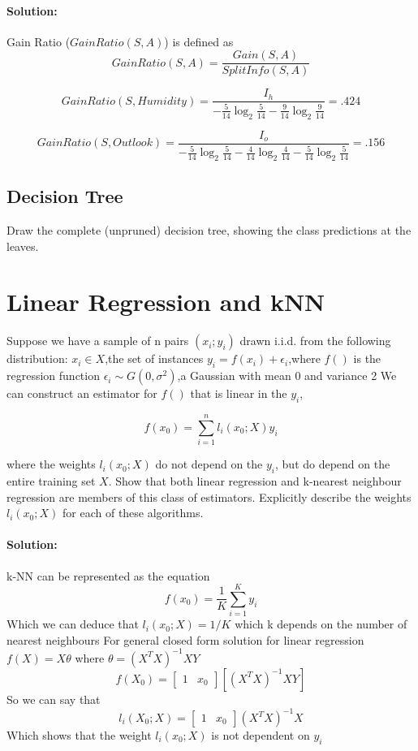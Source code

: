 \documentclass{article}
\begin{document}
\paragraph{Solution:}
Gain Ratio ($GainRatio(S,A)$) is defined as
$$ GainRatio(S,A) = \frac{Gain(S,A)}{SplitInfo(S,A)}
$$ 

$$ GainRatio(S,Humidity) = \frac{I_h}{-\frac{5}{14}\log_2\frac{5}{14} - \frac{9}{14}\log_2\frac{9}{14}} = .424
$$

$$ GainRatio(S,Outlook) = \frac{I_o}{-\frac{5}{14}\log_2\frac{5}{14} - \frac{4}{14}\log_2\frac{4}{14} - \frac{5}{14}\log_2\frac{5}{14}} = .156
$$

\subsection {Decision Tree} 
Draw the complete (unpruned) decision tree, showing the class predictions at the leaves. 


\section{Linear Regression and kNN}

Suppose we have a sample of n pairs $(x_i; y_i)$ drawn i.i.d. from the following
distribution:
\newline
$x_i\in X$,the set of instances
\newline 
$y_i = f(x_i) + \epsilon_i$,where $f()$ is the regression function
\newline 
$\epsilon_i \sim G(0,\sigma^2)$,a Gaussian with mean 0 and variance 2
\newline 
We can construct an estimator for $f()$ that is linear in the $y_i$,

$$f(x_0) =\displaystyle\sum\limits_{i=1}^n l_i(x_0; X)y_i
$$

where the weights $l_i(x_0;X)$ do not depend on the $y_i$, but do depend on the entire training set $X$. Show that
both linear regression and k-nearest neighbour regression are members of this class of estimators. 
\newline 
Explicitly describe the weights $l_i(x_0;X)$ for each of these algorithms.

\paragraph {Solution:}
k-NN can be represented as the equation 
$$f(x_0) = \frac{1}{K} \displaystyle\sum\limits_{i =1}^K y_i
$$
Which we can deduce that $l_i (x_0; X)  = 1/K$ which k depends on the number of nearest neighbours 
\newline
For general closed form solution for linear regression
\newline  
 $ f(X) = X\theta  $  where $ \theta = (X^TX)^{-1}XY $
 $$f(X_0) =[\begin{matrix} 1 & x_0 \end{matrix} ][(X^TX)^{-1}XY]$$ 
 So we can say that 
 $$l_i(X_0;X) = [\begin{matrix} 1 & x_0 \end{matrix} ] (X^TX)^{-1}X $$ 
 Which shows that the weight $l_i(x_0;X)$ is not dependent on $y_i$ 
 
\end{document}
